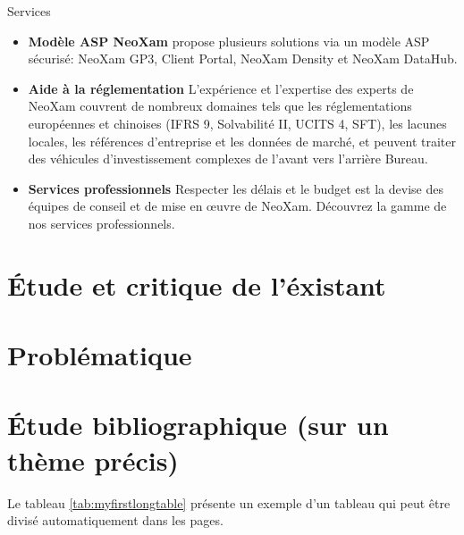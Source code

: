 \begin{subsection}{Services}
\begin{itemize}[label=\textbullet,font=\normalsize]
\item  \textbf{Modèle ASP NeoXam} propose plusieurs solutions via un modèle ASP sécurisé: NeoXam GP3, Client Portal, NeoXam Density et NeoXam DataHub.
\item \textbf{Aide à la réglementation}  L'expérience et l'expertise des experts de NeoXam couvrent de nombreux domaines tels que les réglementations européennes et chinoises (IFRS 9, Solvabilité II, UCITS 4, SFT), les lacunes locales, les références d'entreprise et les données de marché, et peuvent traiter des véhicules d'investissement complexes de l'avant vers l'arrière Bureau.
\item \textbf{ Services professionnels} Respecter les délais et le budget est la devise des équipes de conseil et de mise en œuvre de NeoXam. Découvrez la gamme de nos services professionnels.
\end{itemize} 

\end{subsection}








\section{\'Etude et critique de l'éxistant}
\section{Problématique}
\section{\'Etude bibliographique (sur un thème précis)}


Le tableau \ref{tab:myfirstlongtable} présente un exemple d'un tableau qui peut être divisé automatiquement dans les pages.

